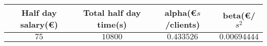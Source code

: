 \begin{tabular}{|c|c|c|c|}
\hline 
Half day salary(\euro ) & Total half day time(s) & alpha(\euro $s$/clients) & beta(\euro/$s^2$ \\ 
 \hline 
$75$ & $10800$ & $0.433526$ & $0.00694444$ \\ 
 \hline 
 
 \end{tabular}